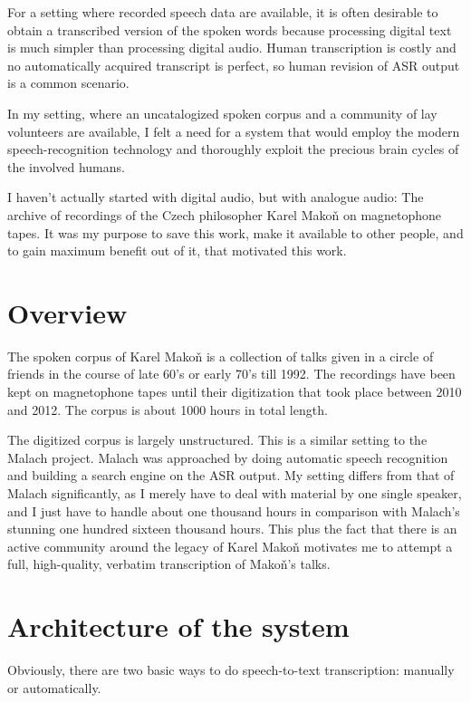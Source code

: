 \documentclass[hidelinks,12pt,a4paper]{report}
\begin{document}
For a setting where recorded speech data are available, it is often desirable to
obtain a transcribed version of the spoken words because processing digital text
is much simpler than processing digital audio. Human transcription is costly and
no automatically acquired transcript is perfect, so human revision of ASR
output is a common scenario.

In my setting, where an uncatalogized spoken corpus and a community of lay
volunteers are available, I felt a need for a system that would employ the
modern speech-recognition technology and thoroughly exploit the precious brain
cycles of the involved humans.

I haven't actually started with digital audio, but with analogue audio: The
archive of recordings of the Czech philosopher Karel Makoň on magnetophone
tapes. It was my purpose to save this work, make it available to other people,
and to gain maximum benefit out of it, that motivated this work.

\section{Overview}

The spoken corpus of Karel Mako\v{n} is a collection of talks given in a circle
of friends in the course of late 60's or early 70's till 1992. The recordings
have been kept on magnetophone tapes until their digitization that took place
between 2010 and 2012. The corpus is about 1000 hours in total length.

The digitized corpus is largely unstructured. 
This is a similar setting to the Malach\cite{psutka2005automatic} project. Malach was
approached by doing automatic speech recognition and building a search engine on
the ASR output. My setting differs from that of Malach significantly, as I
merely have to deal with material by one single speaker, and I just have to handle about one thousand hours
in comparison with Malach's stunning one hundred sixteen thousand hours. This
plus the fact that there is an active community around the legacy of Karel
Mako\v{n} motivates me to attempt a full, high-quality, verbatim transcription
of Mako\v{n}'s talks.

\section{Architecture of the system}

Obviously, there are two basic ways to do speech-to-text transcription:
manually or
automatically.
\end{document}
